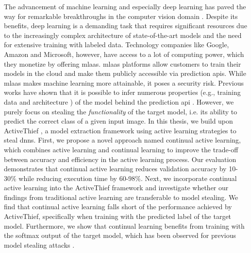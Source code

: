 \Abstract
The advancement of machine learning and especially deep learning has paved the way for remarkable breakthroughs in the computer vision domain 
\parencite*{goodfellow2020generative,he2016deep,lecun1989backpropagation}. Despite its benefits, deep learning is a demanding task that requires
significant resources due to the increasingly complex architecture of state-of-the-art models and the need for extensive training with labeled data.
Technology companies like Google, Amazon and Microsoft, however, have access to a lot of computing power, which they monetize by offering \gls{mlaas}.
\gls{mlaas} platforms allow customers to train their models in the cloud and make them publicly accessible via prediction \glspl{api}. 
While \gls{mlaas} makes machine learning more attainable, it poses a security risk. Previous works have shown that it is possible to infer numerous
properties (e.g., training data \cite{shokri2017membership} and architecture \cite{oh2019towards}) of the model behind the prediction \gls{api}
\parencite{papernot2017practical,tramer2016stealing}.
However, we purely focus on stealing the \textit{functionality} of the target model, i.e. its ability to predict the correct class of a given input image.
In this thesis, we build upon ActiveThief \cite{pal2020activethief}, a model extraction framework using active learning strategies to steal \glspl{dnn}. 
First, we propose a novel approach named continual active learning, which combines active learning and continual learning to improve the trade-off between
accuracy and efficiency in the active learning process. Our evaluation demonstrates that continual active learning reduces validation accuracy by 10-30\%
while reducing execution time by 60-98\%. Next, we incorporate continual active learning into the ActiveThief framework and investigate whether our findings
from traditional active learning are transferable to model stealing. We find that continual active learning falls short of the performance achieved by ActiveThief,
specifically when training with the predicted label of the target model. Furthermore, we show that continual learning benefits from training with the softmax
output of the target model, which has been observed for previous model stealing attacks \parencite{orekondy2019knockoff,pal2020activethief}.
